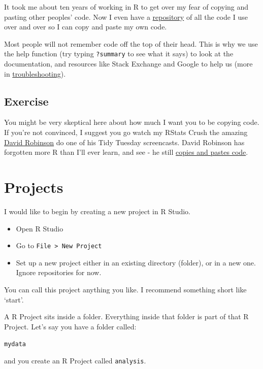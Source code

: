 \documentclass[
]{book}
\begin{document}
It took me about ten years of working in R to get over my fear of copying and pasting other peoples' code. Now I even have a \href{https://github.com/jillymackay/commoncode}{repository} of all the code I use over and over so I can copy and paste my own code.

Most people will not remember code off the top of their head. This is why we use the help function (try typing \texttt{?summary} to see what it says) to look at the documentation, and resources like Stack Exchange and Google to help us (more in \protect\hyperlink{trouble}{troubleshooting}).

\hypertarget{ex_tidytuesday}{%
\subsection{Exercise}\label{ex_tidytuesday}}

You might be very skeptical here about how much I want you to be copying code. If you're not convinced, I suggest you go watch my RStats Crush the amazing \href{https://twitter.com/drob}{David Robinson} do one of his Tidy Tuesday screencasts. David Robinson has forgotten more R than I'll ever learn, and see - he still \href{https://www.youtube.com/channel/UCeiiqmVK07qhY-wvg3IZiZQ}{copies and pastes code}.

\hypertarget{projects}{%
\section{Projects}\label{projects}}

I would like to begin by creating a new project in R Studio.

\begin{itemize}
\item
  Open R Studio
\item
  Go to \texttt{File\ \textgreater{}\ New\ Project}
\item
  Set up a new project either in an existing directory (folder), or in a new one. Ignore repositories for now.
\end{itemize}

You can call this project anything you like. I recommend something short like `start'.

A R Project sits inside a folder. Everything inside that folder is part of that R Project. Let's say you have a folder called:

\texttt{mydata}

and you create an R Project called \texttt{analysis}.
\end{document}
